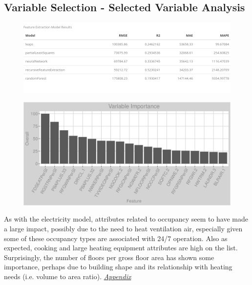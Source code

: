 \subsection{Variable Selection - Selected Variable Analysis}
\begin{figure}[h]
\centering
\includegraphics[width=.8\textwidth, height=0.25\textheight]{Images/natural_gas_psf_fe_summary.png}
\end{figure}
\begin{figure}[h]
\centering
\includegraphics[width=.99\textwidth, height=0.375\textheight]{Images/natural_gas_psf_all_vars.png}
\end{figure}
\FloatBarrier

As with the electricity model, attributes related to occupancy seem to have made a large impact, possibly due to the need to heat ventilation air, especially given some of these occupancy types are associated with 24/7 operation.  Also as expected, cooking and large heating equipment attributes are high on the list.  Surprisingly, the number of floors per gross floor area has shown some importance, perhaps due to building shape and its relationship with heating needs (i.e. volume to area ratio). \textit{\hyperref[appendix:natural_gas:sva]{Appendix}}